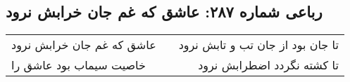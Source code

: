 \begin{center}
\section*{رباعی شماره ۲۸۷: عاشق که غم جان خرابش نرود}
\label{sec:sh287}
\begin{longtable}{l p{0.5cm} r}
عاشق که غم جان خرابش نرود
&&
تا جان بود از جان تب و تابش نرود
\\
خاصیت سیماب بود عاشق را
&&
تا کشته نگردد اضطرابش نرود
\\
\end{longtable}
\end{center}
